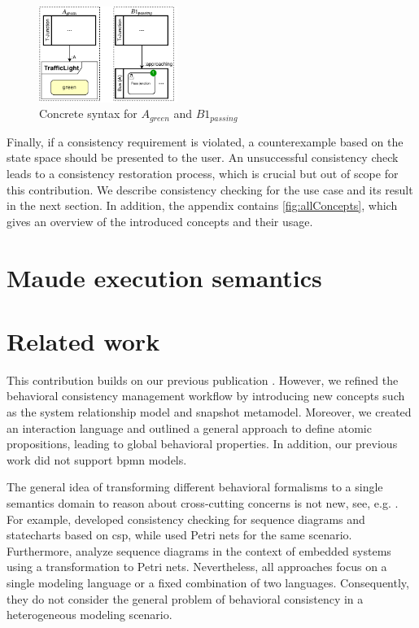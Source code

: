 \documentclass{jot}
\begin{document}
\begin{figure}[h]
    \centering
    \includegraphics[width=0.4\textwidth]{figures/atomic_props_concrete.pdf}
    \caption{Concrete syntax for $A_{green}$ and $B1_{passing}$}
    \label{fig:atomic_propositions_concrete}
\end{figure}

Finally, if a consistency requirement is violated, a counterexample based on the state space should be presented to the user.
An unsuccessful consistency check leads to a consistency restoration process, which is crucial but out of scope for this contribution.
We describe consistency checking for the use case and its result in the next section.
In addition, the appendix contains \autoref{fig:allConcepts}, which gives an overview of the introduced concepts and their usage.

\section{Maude execution semantics} \label{sec:maude_execution_semantics}


\section{Related work} \label{sec:related_work}
This contribution builds on our previous publication \cite{krauterBehavioralConsistencyHeterogeneous2021}.
However, we refined the behavioral consistency management workflow by introducing new concepts such as the system relationship model and snapshot metamodel.
Moreover, we created an interaction language and outlined a general approach to define atomic propositions, leading to global behavioral properties.
In addition, our previous work did not support \gls*{bpmn} models.

The general idea of transforming different behavioral formalisms to a single semantics domain to reason about cross-cutting concerns is not new, see, e.g. \cite{engelsMethodologySpecifyingAnalyzing2001}.
For example, \cite{kusterExplicitBehavioralConsistency2003} developed consistency checking for sequence diagrams and statecharts based on \gls*{csp}, while \cite{yaoConsistencyCheckingUML2006} used Petri nets for the same scenario.
Furthermore, \cite{cunhaFormalVerificationUML2011} analyze sequence diagrams in the context of embedded systems using a transformation to Petri nets.
Nevertheless, all approaches focus on a single modeling language or a fixed combination of two languages.
Consequently, they do not consider the general problem of behavioral consistency in a heterogeneous modeling scenario.
\end{document}
